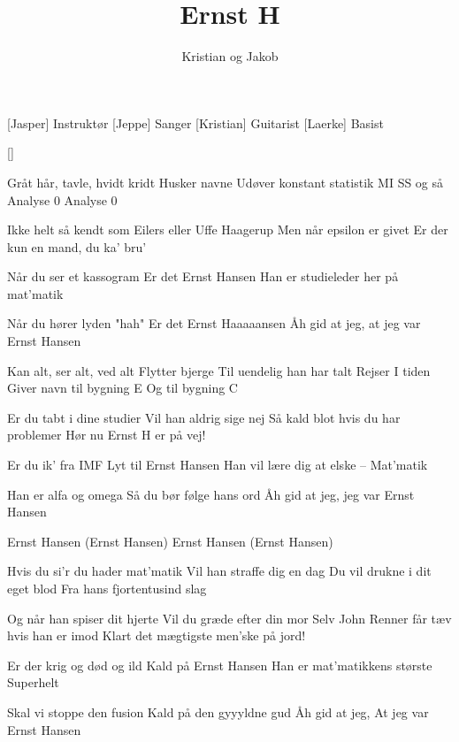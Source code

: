 \documentclass[a4paper,11pt]{article}
\title{Ernst H}
\author{Kristian og Jakob}
\begin{document}
\maketitle

\begin{roles}
[Jasper] Instruktør
[Jeppe] Sanger
[Kristian] Guitarist
[Laerke] Basist
\end{roles}

\begin{props}
[]
\end{props}

\begin{song}
 Gråt hår, tavle, hvidt kridt
Husker navne
Udøver konstant statistik
MI
SS
og så Analyse 0
Analyse 0

Ikke helt så kendt som Eilers
eller Uffe Haagerup
Men når epsilon er givet
Er der kun en mand, du ka' bru'

Når du ser et kassogram
Er det Ernst Hansen
Han er studieleder her på mat'matik

Når du hører lyden "hah"
Er det Ernst Haaaaansen
Åh gid at jeg, at jeg var Ernst Hansen

Kan alt, ser alt, ved alt
Flytter bjerge
Til uendelig han har talt
Rejser
I tiden
Giver navn til bygning E
Og til bygning C

Er du tabt i dine studier
Vil han aldrig sige nej
Så kald blot hvis du har problemer
Hør nu Ernst H er på vej!

Er du ik' fra IMF
Lyt til Ernst Hansen
Han vil lære dig at elske – Mat'matik

Han er alfa og omega
Så du bør følge hans ord
Åh gid at jeg, jeg var Ernst Hansen

Ernst Hansen (Ernst Hansen)
Ernst Hansen (Ernst Hansen)

Hvis du si'r du hader mat'matik
Vil han straffe dig en dag
Du vil drukne i dit eget blod
Fra hans fjortentusind slag

Og når han spiser dit hjerte
Vil du græde efter din mor
Selv John Renner får tæv hvis han er imod
Klart det mægtigste men'ske på jord!

Er der krig og død og ild
Kald på Ernst Hansen
Han er mat'matikkens største
Superhelt

Skal vi stoppe den fusion
Kald på den gyyyldne gud
Åh gid at jeg,
At jeg var Ernst Hansen
\end{song}
\end{document}
